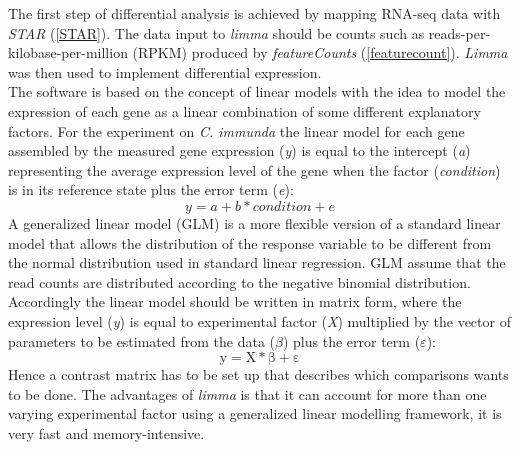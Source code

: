 \documentclass[12pt, a4paper]{report}
\begin{document}
The first step of differential analysis is achieved by mapping RNA-seq data with \textit{STAR} (\ref{STAR}). The data input to \textit{limma} should be counts such as reads-per-kilobase-per-million (RPKM) produced by \textit{featureCounts} (\ref{featurecount}). \textit{Limma} was then used to implement differential expression. \\
The software is based on the concept of linear models with the idea to model the expression of each gene as a linear combination of some different explanatory factors. For the experiment on \textit{C. immunda} the linear model for each gene assembled by the measured gene expression (\textit{y}) is equal to the intercept (\textit{a}) representing the average expression level of the gene when the factor (\textit{condition}) is in its reference state plus the error term (\textit{e}): 
\[y = a + b * condition + e\]
A generalized linear model (GLM) is a more flexible version of a standard linear model that allows the distribution of the response variable to be different from the normal distribution used in standard linear regression. GLM assume that the read counts are distributed according to the negative binomial distribution. 
Accordingly the linear model should be written in matrix form, where the expression level (\textit{y}) is equal to experimental factor (\textit{X}) multiplied by the vector of parameters to be estimated from the data ($\beta$) plus the error term ($\varepsilon$):
\[ \mathrm{ y = X * \beta + \varepsilon}\]
Hence a contrast matrix has to be set up that describes which comparisons wants to be done. The advantages of \textit{limma} is that it can account for more than one varying experimental factor using a generalized linear modelling framework, it is very fast and memory-intensive. \cite{Ritchie2015}
\end{document}
